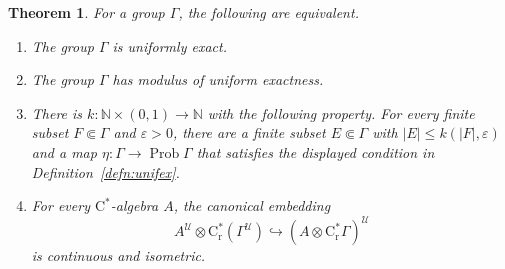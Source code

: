 \documentclass[12pt,nosumlimits,nonamelimits]{amsart}
\newtheorem{thm}{Theorem}
\theoremstyle{remark}
\theoremstyle{definition}
\newcommand{\IN}{\mathbb{N}}
\newcommand{\rC}{\mathrm{C}}
\newcommand{\rr}{\mathrm{r}}
\newcommand{\cU}{\mathcal{U}}
\newcommand{\ve}{\varepsilon}
\newcommand{\Ga}{\Gamma}
\DeclareMathOperator{\Prob}{Prob}
\newcommand{\cst}{$\rC^*$-alge\-bra}
\begin{document}
\begin{thm}\label{thm;unfiexmod}
For a group $\Ga$, the following are equivalent.
\begin{enumerate}
\item\label{equiv:unifex} 
The group $\Ga$ is uniformly exact. 
\item\label{equiv:unifexmod}
The group $\Ga$ has modulus of uniform exactness. 
\item\label{equiv:unifexmod2}
There is $k\colon \IN\times(0,1) \to \IN$ with
the following property. 
For every finite subset $F\Subset\Ga$ and $\ve>0$, 
there are a finite subset $E\Subset\Ga$ with $|E|\le k(|F|,\ve)$ 
and a map $\eta\colon\Ga\to\Prob \Ga$ 
that satisfies the displayed condition in Definition~\ref{defn:unifex}.
\item\label{equiv:unifexcst}
For every \cst{} $A$, the canonical embedding 
\[
A^\cU \otimes \rC^*_\rr(\Ga^\cU)
 \hookrightarrow (A \otimes \rC^*_\rr\Ga)^\cU
\]
is continuous and isometric. 
\end{enumerate}
\end{thm}
\end{document}
